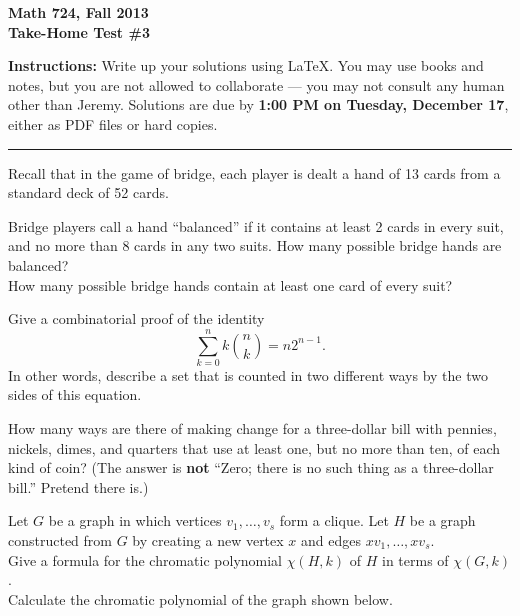 

\thispagestyle{empty}

\bf Math 724, Fall 2013\\
Take-Home Test \#3\rm

{\bf Instructions:} Write up your solutions using LaTeX.  
You may use books and notes, but you are not allowed to collaborate ---
you may not consult any human other than Jeremy.
Solutions are due by {\bf 1:00 PM on Tuesday, December 17}, either as PDF files or hard copies.
\medskip\hrule\bigskip

\prob
Recall that in the game of bridge, each player is dealt  a hand of 13 cards from a standard deck of 52 cards.

 Bridge players call a hand ``balanced'' if it contains at least 2 cards in every suit, and no more than 8 cards in any two suits.  How many possible bridge hands are balanced?\\
 How many possible bridge hands contain at least one card of every suit?

 Give a combinatorial proof of the identity
\[\sum_{k=0}^n k\binom{n}{k}=n2^{n-1}.\]
In other words, describe a set that is counted in two different ways by the two sides of this equation.

 How many ways are there of making change for a three-dollar bill with pennies, nickels, dimes, and quarters that use
at least one, but no more than ten, of each kind of coin?
(The answer is {\bf not} ``Zero; there is no such thing as a three-dollar bill.''  Pretend there is.)


\prob Let $G$ be a graph in which vertices $v_1,\dots,v_s$ form a clique.  Let $H$ be a graph constructed from $G$ by creating a new vertex $x$ and edges $xv_1,\dots,xv_s$.\\
  Give a formula for the chromatic polynomial $\chi(H,k)$ of $H$ in terms of $\chi(G,k)$.\pad\\
 Calculate the chromatic polynomial of the graph shown below.

